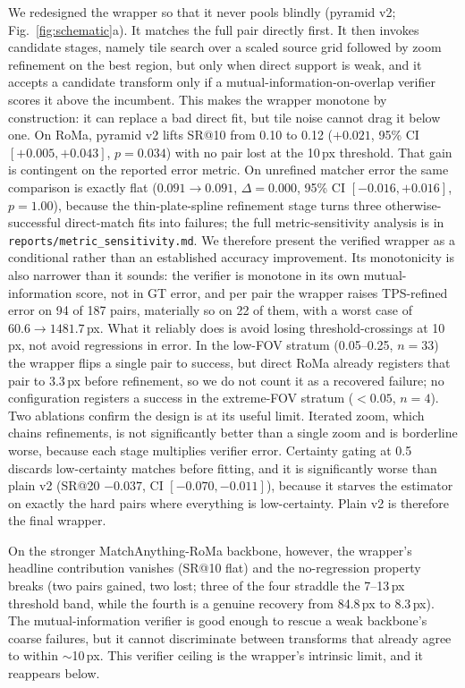 \documentclass[fleqn,10pt]{wlscirep}
\begin{document}
We redesigned the wrapper so that it never pools blindly (pyramid v2; Fig.~\ref{fig:schematic}a). It matches the full pair directly first. It then invokes candidate stages, namely tile search over a scaled source grid followed by zoom refinement on the best region, but only when direct support is weak, and it accepts a candidate transform only if a mutual-information-on-overlap verifier scores it above the incumbent. This makes the wrapper monotone by construction: it can replace a bad direct fit, but tile noise cannot drag it below one. On RoMa, pyramid v2 lifts SR@10 from 0.10 to 0.12 ($+0.021$, 95\% CI $[+0.005,+0.043]$, $p=0.034$) with no pair lost at the 10\,px threshold. That gain is contingent on the reported error metric. On unrefined matcher error the same comparison is exactly flat ($0.091\rightarrow0.091$, $\Delta=0.000$, 95\% CI $[-0.016,+0.016]$, $p=1.00$), because the thin-plate-spline refinement stage turns three otherwise-successful direct-match fits into failures; the full metric-sensitivity analysis is in \texttt{reports/metric\_sensitivity.md}. We therefore present the verified wrapper as a conditional rather than an established accuracy improvement. Its monotonicity is also narrower than it sounds: the verifier is monotone in its own mutual-information score, not in GT error, and per pair the wrapper raises TPS-refined error on 94 of 187 pairs, materially so on 22 of them, with a worst case of $60.6\rightarrow1481.7$\,px. What it reliably does is avoid losing threshold-crossings at 10\,px, not avoid regressions in error. In the low-FOV stratum (0.05--0.25, $n=33$) the wrapper flips a single pair to success, but direct RoMa already registers that pair to 3.3\,px before refinement, so we do not count it as a recovered failure; no configuration registers a success in the extreme-FOV stratum ($<0.05$, $n=4$). Two ablations confirm the design is at its useful limit. Iterated zoom, which chains refinements, is not significantly better than a single zoom and is borderline worse, because each stage multiplies verifier error. Certainty gating at 0.5 discards low-certainty matches before fitting, and it is significantly worse than plain v2 (SR@20 $-0.037$, CI $[-0.070,-0.011]$), because it starves the estimator on exactly the hard pairs where everything is low-certainty. Plain v2 is therefore the final wrapper.

On the stronger MatchAnything-RoMa backbone, however, the wrapper's headline contribution vanishes (SR@10 flat) and the no-regression property breaks (two pairs gained, two lost; three of the four straddle the 7--13\,px threshold band, while the fourth is a genuine recovery from 84.8\,px to 8.3\,px). The mutual-information verifier is good enough to rescue a weak backbone's coarse failures, but it cannot discriminate between transforms that already agree to within $\sim$10\,px. This verifier ceiling is the wrapper's intrinsic limit, and it reappears below.
\end{document}
